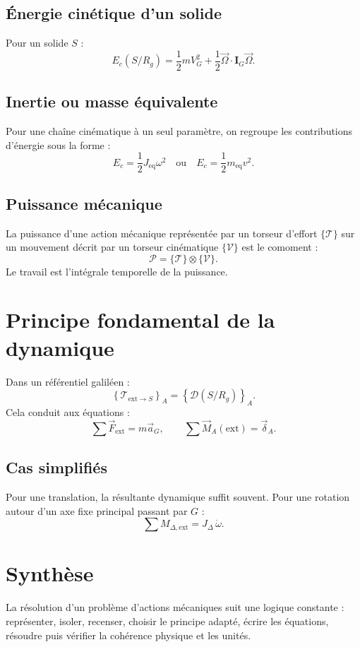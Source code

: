 \subsection{Énergie cinétique d'un solide}
Pour un solide $S$ :
\[
E_c(S/R_g)=\frac12 mV_G^2+\frac12\vec\Omega\cdot\mathbf I_G\vec\Omega.
\]

\subsection{Inertie ou masse équivalente}
Pour une chaîne cinématique à un seul paramètre, on regroupe les contributions d'énergie sous la forme :
\[
E_c=\frac12 J_{\mathrm{eq}}\omega^2
\quad\text{ou}\quad
E_c=\frac12 m_{\mathrm{eq}}v^2.
\]

\subsection{Puissance mécanique}
La puissance d'une action mécanique représentée par un torseur d'effort $\{\mathcal T\}$ sur un mouvement décrit par un torseur cinématique $\{\mathcal V\}$ est le comoment :
\[
\mathcal P=\{\mathcal T\}\otimes\{\mathcal V\}.
\]
Le travail est l'intégrale temporelle de la puissance.

\section{Principe fondamental de la dynamique}
Dans un référentiel galiléen :
\[
\left\{\mathcal T_{\mathrm{ext}\rightarrow S}\right\}_A=
\left\{\mathcal D(S/R_g)\right\}_A.
\]
Cela conduit aux équations :
\[
\sum\vec F_{\mathrm{ext}}=m\vec a_G,
\qquad
\sum\vec M_A(\mathrm{ext})=\vec\delta_A.
\]

\subsection{Cas simplifiés}
Pour une translation, la résultante dynamique suffit souvent. Pour une rotation autour d'un axe fixe principal passant par $G$ :
\[
\sum M_{\Delta,\mathrm{ext}}=J_\Delta\,\dot\omega.
\]

\section{Synthèse}
La résolution d'un problème d'actions mécaniques suit une logique constante : représenter, isoler, recenser, choisir le principe adapté, écrire les équations, résoudre puis vérifier la cohérence physique et les unités.
